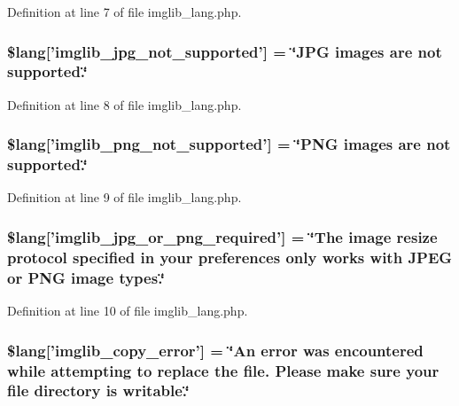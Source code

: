 Definition at line 7 of file imglib\-\_\-lang.\-php.

\hypertarget{imglib__lang_8php_a4acdc927c172bab1370b2897c667c552}{
\subsubsection[{\$lang}]{\setlength{\rightskip}{0pt plus 5cm}\$lang\mbox{[}'imglib\-\_\-jpg\-\_\-not\-\_\-supported'\mbox{]} = \char`\"{}J\-P\-G images are {\bf not} supported.\char`\"{}}}\label{imglib__lang_8php_a4acdc927c172bab1370b2897c667c552}


Definition at line 8 of file imglib\-\_\-lang.\-php.

\hypertarget{imglib__lang_8php_a0b7ea2e2fbd03eb72fe9d969adb643dd}{
\subsubsection[{\$lang}]{\setlength{\rightskip}{0pt plus 5cm}\$lang\mbox{[}'imglib\-\_\-png\-\_\-not\-\_\-supported'\mbox{]} = \char`\"{}P\-N\-G images are {\bf not} supported.\char`\"{}}}\label{imglib__lang_8php_a0b7ea2e2fbd03eb72fe9d969adb643dd}


Definition at line 9 of file imglib\-\_\-lang.\-php.

\hypertarget{imglib__lang_8php_a2878e2b878871cd8010970f865d70e71}{
\subsubsection[{\$lang}]{\setlength{\rightskip}{0pt plus 5cm}\$lang\mbox{[}'imglib\-\_\-jpg\-\_\-or\-\_\-png\-\_\-required'\mbox{]} = \char`\"{}The image resize protocol specified in your preferences only works with J\-P\-E\-G {\bf or} P\-N\-G image types.\char`\"{}}}\label{imglib__lang_8php_a2878e2b878871cd8010970f865d70e71}


Definition at line 10 of file imglib\-\_\-lang.\-php.

\hypertarget{imglib__lang_8php_a012b6a0d2b3a8ef934e8783d2fbd6535}{
\subsubsection[{\$lang}]{\setlength{\rightskip}{0pt plus 5cm}\$lang\mbox{[}'imglib\-\_\-copy\-\_\-error'\mbox{]} = \char`\"{}An error was encountered while attempting {\bf to} replace the file. Please make sure your file directory is writable.\char`\"{}}}\label{imglib__lang_8php_a012b6a0d2b3a8ef934e8783d2fbd6535}


